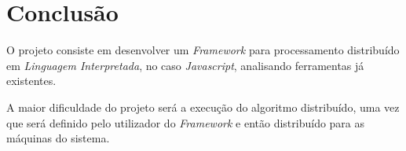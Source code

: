 \chapter{Conclusão}
\label{conclusao}
O projeto consiste em desenvolver um \emph{Framework} para processamento
distribuído em \emph{Linguagem Interpretada}, no caso \emph{Javascript}, analisando
ferramentas já existentes.

A maior dificuldade do projeto será a execução do algoritmo distribuído, uma vez
que será definido pelo utilizador do \emph{Framework} e então distribuído para
as máquinas do sistema.
